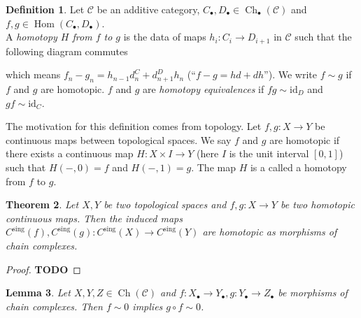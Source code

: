 \documentclass{article}
\newcommand{\id}{\mathrm{id}}
\newcommand{\sing}{\mathrm{sing}}
\newcommand{\cat}{\mathcal{C}}
\DeclareMathOperator{\Ch}{Ch}
\DeclareMathOperator{\Hom}{Hom}
\newcommand{\todo}{\textbf{TODO}}
\theoremstyle{plain}
\newtheorem{theorem}{Theorem}[section]
\newtheorem{lemma}[theorem]{Lemma}
\theoremstyle{definition}
\newtheorem{definition}[theorem]{Definition}
\theoremstyle{remark}
\begin{document}
\begin{definition}
    Let $\cat$ be an additive category, $C_\bullet,D_\bullet \in \Ch_\bullet (\cat)$ and $f,g \in \Hom(C_\bullet,D_\bullet)$. \\ A \emph{homotopy $H$ from $f$ to $g$} is the data of maps $h_i : C_i \to D_{i+1}$ in $\cat$ such that the following diagram commutes
    \begin{center}
    \end{center}
    which means $f_n - g_n = h_{n-1}d_n^C + d_{n+1}^D h_n$ (``$f-g = hd+dh$''). We write $f \sim g$ if $f$ and $g$ are homotopic. $f$ and $g$ are \emph{homotopy equivalences} if $fg \sim \id_D$ and $gf \sim \id_C$.
\end{definition}

The motivation for this definition comes from topology. Let $f,g : X\to Y$ be continuous maps between topological spaces. We say $f$ and $g$ are homotopic if there exists a continuous map $H : X \times I \to Y$ (here $I$ is the unit interval $[0,1]$) such that $H(-,0) = f$ and $H(-,1) = g$. The map $H$ is a called a homotopy from $f$ to $g$.

\begin{theorem}
    Let $X,Y$ be two topological spaces and $f,g : X \to Y$ be two homotopic continuous maps. Then the induced maps $C^\sing(f),C^\sing(g) : C^\sing(X) \to C^\sing(Y)$ are homotopic as morphisms of chain complexes.
\end{theorem}

\begin{proof}
    \todo
\end{proof}

\begin{lemma} \label{homotopylemma}
    Let $X,Y,Z \in \Ch(\cat)$ and $f : X_\bullet \to Y_\bullet,g: Y_\bullet \to Z_\bullet$ be morphisms of chain complexes. Then $f \sim 0$ implies $g\circ f \sim 0$.
\end{lemma}
\end{document}
